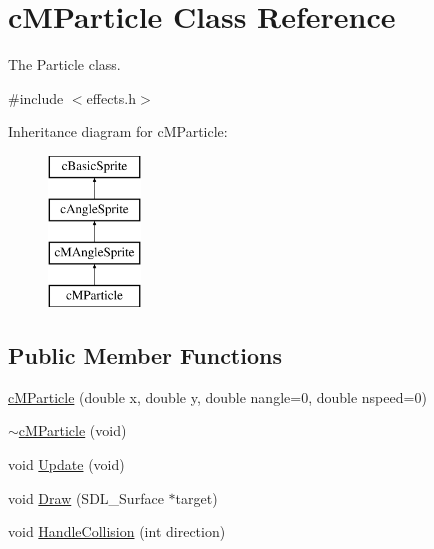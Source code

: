 \hypertarget{classc_m_particle}{\section{c\-M\-Particle Class Reference}
\label{classc_m_particle}
}


The Particle class.  




{\ttfamily \#include $<$effects.\-h$>$}

Inheritance diagram for c\-M\-Particle\-:\begin{figure}[H]
\begin{center}
\leavevmode
\includegraphics[height=4.000000cm]{classc_m_particle}
\end{center}
\end{figure}
\subsection*{Public Member Functions}
\begin{DoxyCompactItemize}
\item 
\hyperlink{classc_m_particle_a4146359078952df6f3254ca721143401}{c\-M\-Particle} (double x, double y, double nangle=0, double nspeed=0)
\item 
\hyperlink{classc_m_particle_a841f87e4bcdd4688429c836767c76837}{$\sim$c\-M\-Particle} (void)
\item 
void \hyperlink{classc_m_particle_a51a5aef9295c60549d64fdf87aa06524}{Update} (void)
\item 
void \hyperlink{classc_m_particle_a4c759a149bb5fe20c002ac9fb7806226}{Draw} (S\-D\-L\-\_\-\-Surface $\ast$target)
\item 
void \hyperlink{classc_m_particle_a3b2f0d5efe396abb2d2c299883ae1c2b}{Handle\-Collision} (int direction)
\end{DoxyCompactItemize}
